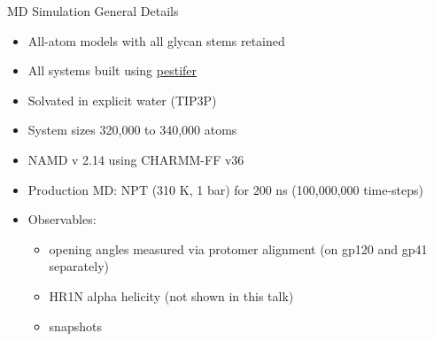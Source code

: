 \begin{frame}[fragile]{MD Simulation General Details}
    \begin{itemize}
        \item All-atom models with all glycan stems retained
        \item All systems built using \href{https://pestifer.readthedocs.io/en/latest/}{pestifer}
        \item Solvated in explicit water (TIP3P)
        \item System sizes 320,000 to 340,000 atoms
        \item NAMD v 2.14 using CHARMM-FF v36
        \item Production MD: NPT (310 K, 1 bar) for 200 ns (100,000,000 time-steps)
        \item Observables:
        \begin{itemize}
            \item opening angles measured via protomer alignment (on gp120 and gp41 separately)
            \item HR1N alpha helicity (not shown in this talk)
            \item snapshots
        \end{itemize}
    \end{itemize}
\end{frame}

